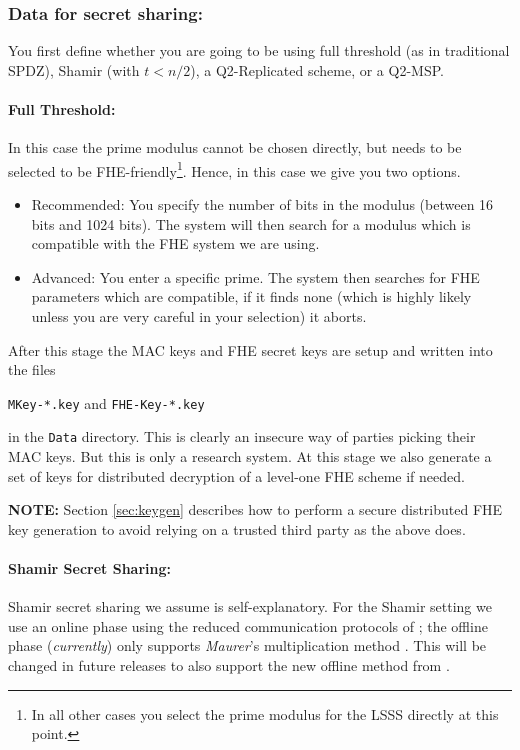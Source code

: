 \subsubsection{Data for secret sharing:}
You first define whether you are going to be using full threshold (as in
traditional SPDZ), Shamir (with $t<n/2$), a Q2-Replicated scheme, or
a Q2-MSP.

\paragraph{Full Threshold:}
In this case the prime modulus cannot be chosen directly, but
needs to be selected to be FHE-friendly\footnote{In all other cases you select the prime modulus for the LSSS directly at this point.}.
Hence, in this case we give you two options.
\begin{itemize}
\item Recommended: You specify the number of bits in the modulus
(between 16 bits and 1024 bits).  The system will then
search for a modulus which is compatible with the FHE system we are
using.
\item Advanced: You enter a specific prime. The system then searches
for FHE parameters which are compatible, if it finds none (which is highly
likely unless you are very careful in your selection) it aborts.
\end{itemize}
After this stage the MAC keys and FHE secret keys are setup and written into the
files
\begin{center}
\verb+MKey-*.key+ and \verb+FHE-Key-*.key+
\end{center}
in the \verb+Data+ directory.
This is clearly an insecure way of parties picking their MAC keys. But this is only a
research system.
At this stage we also generate a set of keys
for distributed decryption of a level-one FHE scheme if needed.

\textbf{NOTE:} Section \ref{sec:keygen} describes how to perform a secure distributed 
FHE key generation to avoid relying on a trusted third party as the above does.

\iffalse XXXX
For the case of fake offline we assume these keys are on {\em each} computer,
but using fake offline is only for test purposes in any case.
\fi

\paragraph{Shamir Secret Sharing:}
Shamir secret sharing we assume is self-explanatory.
For the Shamir setting we use an online phase using the reduced communication
protocols of \cite{KRSW};
the offline phase ({\em currently}) only supports {\em Maurer}'s multiplication method
\cite{Maurer}.
This will be changed in future releases to also support the new offline method from
\cite{SW18}.


